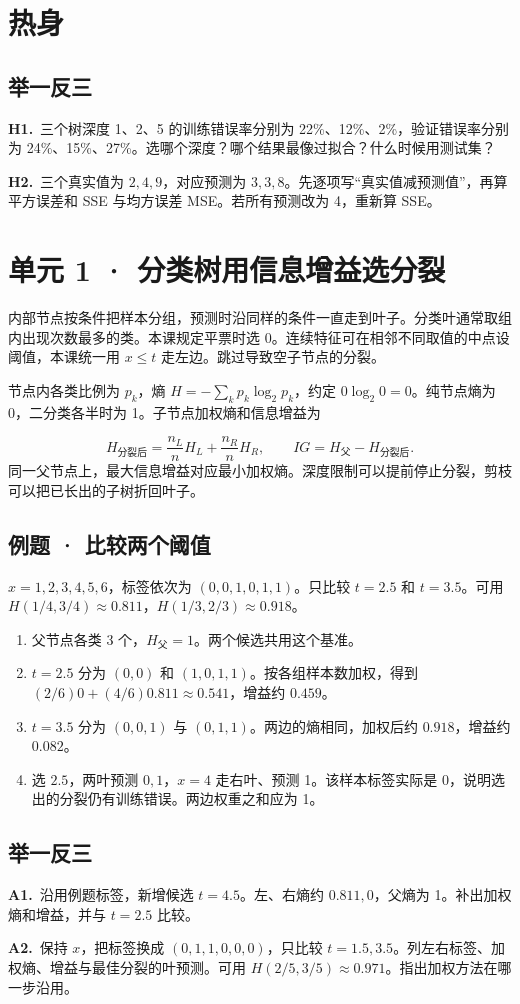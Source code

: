 \documentclass[UTF8,a4paper,11pt]{ctexart}
\newcommand{\CompactQuestion}[2]{\par\noindent\textbf{#1.}\ #2\par\vspace{.8em}}
\begin{document}
\section{热身}
\subsection{举一反三}
\CompactQuestion{H1}{三个树深度 1、2、5 的训练错误率分别为 22\%、12\%、2\%，验证错误率分别为 24\%、15\%、27\%。选哪个深度？哪个结果最像过拟合？什么时候用测试集？}
\CompactQuestion{H2}{三个真实值为 $2,4,9$，对应预测为 $3,3,8$。先逐项写“真实值减预测值”，再算平方误差和 SSE 与均方误差 MSE。若所有预测改为 4，重新算 SSE。}
\clearpage
\section{单元 1 · 分类树用信息增益选分裂}
内部节点按条件把样本分组，预测时沿同样的条件一直走到叶子。分类叶通常取组内出现次数最多的类。本课规定平票时选 0。连续特征可在相邻不同取值的中点设阈值，本课统一用 $x\le t$ 走左边。跳过导致空子节点的分裂。

节点内各类比例为 $p_k$，熵 $H=-\sum_k p_k\log_2 p_k$，约定 $0\log_2 0=0$。纯节点熵为 0，二分类各半时为 1。子节点加权熵和信息增益为

\[H_{\text{分裂后}}=\frac{n_L}{n}H_L+\frac{n_R}{n}H_R,\qquad IG=H_{\text{父}}-H_{\text{分裂后}}.\]
同一父节点上，最大信息增益对应最小加权熵。深度限制可以提前停止分裂，剪枝可以把已长出的子树折回叶子。

\subsection{例题 · 比较两个阈值}
$x=1,2,3,4,5,6$，标签依次为 $(0,0,1,0,1,1)$。只比较 $t=2.5$ 和 $t=3.5$。可用 $H(1/4,3/4)\approx0.811$，$H(1/3,2/3)\approx0.918$。

\begin{enumerate}
\item 父节点各类 3 个，$H_{\text{父}}=1$。两个候选共用这个基准。
\item $t=2.5$ 分为 $(0,0)$ 和 $(1,0,1,1)$。按各组样本数加权，得到 $(2/6)0+(4/6)0.811\approx0.541$，增益约 $0.459$。
\item $t=3.5$ 分为 $(0,0,1)$ 与 $(0,1,1)$。两边的熵相同，加权后约 $0.918$，增益约 $0.082$。
\item 选 $2.5$，两叶预测 $0,1$，$x=4$ 走右叶、预测 1。该样本标签实际是 0，说明选出的分裂仍有训练错误。两边权重之和应为 1。
\end{enumerate}
\subsection{举一反三}
\CompactQuestion{A1}{沿用例题标签，新增候选 $t=4.5$。左、右熵约 $0.811,0$，父熵为 1。补出加权熵和增益，并与 $t=2.5$ 比较。}
\CompactQuestion{A2}{保持 $x$，把标签换成 $(0,1,1,0,0,0)$，只比较 $t=1.5,3.5$。列左右标签、加权熵、增益与最佳分裂的叶预测。可用 $H(2/5,3/5)\approx0.971$。指出加权方法在哪一步沿用。}
\clearpage
\end{document}
